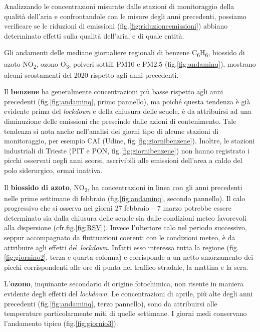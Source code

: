 Analizzando le concentrazioni misurate dalle stazioni di monitoraggio della qualità dell'aria e confrontandole con le misure degli anni precedenti, possiamo verificare se le riduzioni di emissioni (fig.\ref{fig:riduzioneemissioni}) abbiano determinato effetti sulla qualità dell'aria, e di quale entità. 

Gli andamenti delle mediane giornaliere regionali di benzene C\textsubscript{6}H\textsubscript{6}, biossido di azoto NO\textsubscript{2}, ozono O\textsubscript{3}, polveri sottili PM10 e PM2.5 (fig.\ref{fig:andaminq}), mostrano alcuni scostamenti del 2020 rispetto agli anni precedenti.

Il \textbf{benzene} ha generalmente concentrazioni più basse rispetto agli anni precedenti (fig.\ref{fig:andaminq}, primo pannello), ma poiché questa tendenza è già evidente prima del \textit{lockdown} e della chiusura delle scuole, è da attribuirsi ad una diminuzione delle emissioni che prescinde dalle azioni di contenimento. Tale tendenza si nota anche nell'analisi dei giorni tipo di alcune stazioni di monitoraggio, per esempio CAI (Udine, fig.\ref{fig:giornibenzene}). Inoltre, le stazioni industriali di Trieste (PIT e PON, fig.\ref{fig:giornibenzene}) non hanno registrato i picchi osservati negli anni scorsi, ascrivibili alle emissioni dell'area a caldo del polo siderurgico, ormai inattiva.

Il \textbf{biossido di azoto}, NO\textsubscript{2}, ha concentrazioni in linea con gli anni precedenti nelle prime settimane di febbraio (fig.\ref{fig:andaminq}, secondo pannello). Il calo progressivo che si osserva nei giorni 27 febbraio -- 7 marzo potrebbe essere determinato sia dalla chiusura delle scuole sia dalle condizioni meteo favorevoli alla dispersione (cfr.fig.\ref{fig:RSV}). Invece l'ulteriore calo nel periodo successivo, seppur accompagnato da fluttuazioni coerenti con le condizioni meteo, è da attribuire agli effetti del \textit{lockdown}. Infatti esso interessa tutta la regione (fig.\ref{fig:giornino2}, terza e quarta colonna) e corrisponde a un netto smorzamento dei picchi corrispondenti alle ore di punta nel traffico stradale, la mattina e la sera.

L'\textbf{ozono}, inquinante secondario di origine fotochimica, non risente in maniera evidente degli effetti del \textit{lockdown}. Le concentrazioni di aprile, più alte degli anni precedenti (fig.\ref{fig:andaminq}, terzo pannello), sono da attribuirsi alle temperature particolarmente miti di quelle settimane. I giorni medi conservano l'andamento tipico (fig.\ref{fig:giornio3}).

